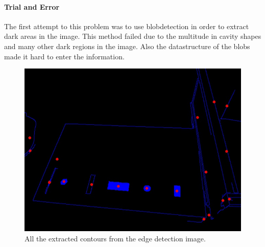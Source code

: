\documentclass{article}
\begin{document}
\paragraph*{Trial and Error}
The first attempt to this problem was to use blobdetection in order to extract dark areas in the image. This method failed due to the multitude in cavity shapes and many other dark regions in the image. Also the datastructure of the blobs made it hard to enter the information. 
\begin{figure}[h!]
\centering
\includegraphics[scale=0.3]{images/cavitycontours.jpg}
\caption{All the extracted contours from the edge detection image.}
\label{fig:cavities}
\end{figure}
\end{document}
